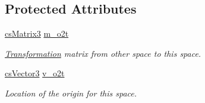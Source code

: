 \subsection*{Protected Attributes}
\begin{DoxyCompactItemize}
\item 
\hyperlink{classcsMatrix3}{cs\+Matrix3} \hyperlink{classcsTransform_a7f5f51248980a3ebf56744520e6a3825}{m\+\_\+o2t}\hypertarget{classcsTransform_a7f5f51248980a3ebf56744520e6a3825}{}\label{classcsTransform_a7f5f51248980a3ebf56744520e6a3825}

\begin{DoxyCompactList}\small\item\em \hyperlink{structTransformation}{Transformation} matrix from \textquotesingle{}other\textquotesingle{} space to \textquotesingle{}this\textquotesingle{} space. \end{DoxyCompactList}\item 
\hyperlink{classcsVector3}{cs\+Vector3} \hyperlink{classcsTransform_a155b35f82b56b9b7bbc8a0b2921d3c17}{v\+\_\+o2t}\hypertarget{classcsTransform_a155b35f82b56b9b7bbc8a0b2921d3c17}{}\label{classcsTransform_a155b35f82b56b9b7bbc8a0b2921d3c17}

\begin{DoxyCompactList}\small\item\em Location of the origin for \textquotesingle{}this\textquotesingle{} space. \end{DoxyCompactList}\end{DoxyCompactItemize}
